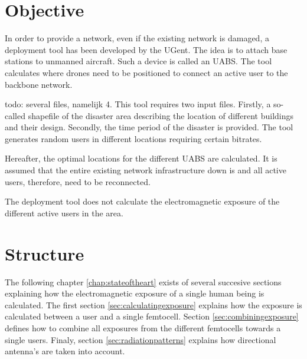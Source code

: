 \section{Objective}
\label{sec:objective}

In order to provide a network, even if the existing network is damaged, a deployment tool has been developed by the UGent. The idea is to attach base stations to unmanned aircraft. Such a device is called an \gls{UABS}. The tool calculates where drones need to be positioned to connect an active user to the backbone network. 

todo: several files, namelijk 4.
This tool requires two input files. Firstly, a so-called shapefile of the disaster area describing the location of different buildings and their design. Secondly, the time period of the disaster is provided. The tool generates random users in different locations requiring certain bitrates.

Hereafter, the optimal locations for the different \gls{UABS} are calculated. It is assumed that the entire existing network infrastructure down is and all active users, therefore, need to be reconnected.

The deployment tool does not calculate the electromagnetic exposure of the different active users in the area.

\section{Structure}
\label{sec:structure}

The following chapter \ref{chap:stateoftheart} exists of several succesive sections explaining how the electromagnetic exposure of a single human being is calculated. The first section \ref{sec:calculatingexposure}
explains how the exposure is calculated between a user and a single femtocell. Section \ref{sec:combiningexposure}  defines how to combine all exposures from the different femtocells towards a single users.
Finaly, section \ref{sec:radiationpatterns} explains how directional antenna's are taken into account.

